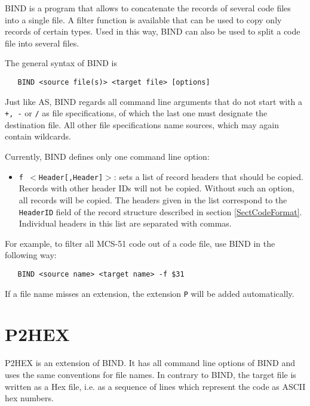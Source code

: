 \documentclass[12pt,twoside]{report}
\newcommand{\tty}[1]{{\tt #1}}
\newcommand{\asname}{{AS}}
\begin{document}
BIND is a program that allows to concatenate the records of several
code files into a single file.  A filter function is available that
can be used to copy only records of certain types.  Used in this way,
BIND can also be used to split a code file into several files.

The general syntax of BIND is
\begin{verbatim}
   BIND <source file(s)> <target file> [options]
\end{verbatim}
Just like \asname{}, BIND regards all command line arguments that do not
start with a \tty{+, -} or \tty{/} as file specifications, of which the last one
must designate the destination file.  All other file specifications
name sources, which may again contain wildcards.

Currently, BIND defines only one command line option:
\begin{itemize}
\item{\tty{f $<$Header[,Header]$>$}: sets a list of record headers that should
      be copied.  Records with other header IDs will
      not be copied.  Without such an option, all
      records will be copied.  The headers given in
      the list correspond to the \tty{HeaderID} field of the
      record structure described in section \ref{SectCodeFormat}.
      Individual headers in this list are separated
      with commas.}
\end{itemize}
For example, to filter all MCS-51 code out of a code file, use BIND
in the following way:
\begin{verbatim}
   BIND <source name> <target name> -f $31
\end{verbatim}
If a file name misses an extension, the extension \tty{P} will be added
automatically.


\section{P2HEX}

P2HEX is an extension of BIND.  It has all command line options of BIND and
uses the same conventions for file names.  In contrary to BIND, the
target file is written as a Hex file, i.e. as a sequence of lines
which represent the code as ASCII hex numbers.
\end{document}
